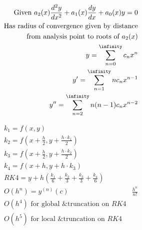 \documentclass[12pt]{article}
\begin{document}
\begin{multicols}{2}

  \begin{equation*}
    \begin{split}
      \text{Given }a_2(x)\frac{d^2y}{dx^2}+a_1(x)\frac{dy}{dx}+a_0(x)y=0\\
      \text{Has radius of convergence given by distance}\\
      \text{from analysis point to roots of } a_2(x)\\
      y=\sum_{n=0}^{\infinity} c_nx^n\\
      y'=\sum_{n=1}^{\infinity} nc_nx^{n-1}\\
      y''=\sum_{n=2}^{\infinity} n(n-1)c_nx^{n-2}\\
    \end{split}
    \label{9}
  \end{equation*}

  \begin{equation*}
    \begin{split}
      k_1=f\left(x,y\right)\\
      k_2=f\left(x+\frac{h}{2},y+\frac{h\cdot k_1}{2}\right)\\
      k_3=f\left(x+\frac{h}{2},y+\frac{h\cdot k_2}{2}\right)\\
      k_4=f\left(x+h,y+h\cdot k_3\right)\\
      RK4=y+h\left( \frac{k_1}{6}+\frac{k_2}{3}+\frac{k_3}{3}+\frac{k_4}{6} \right)\\
      O(h^n)=y^{(n)}\left( c \right)&\frac{h^n}{n!}\\
      O(h^4)\text{ for global &truncation on } RK4\\
      O(h^5)\text{ for local &truncation on } RK4\\
    \end{split}
    \label{10}
  \end{equation*}

\end{multicols}
\end{document}
